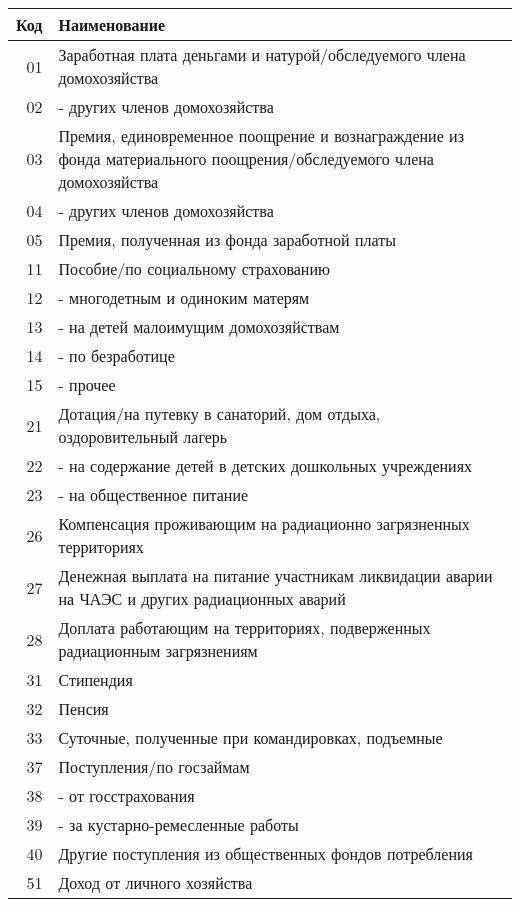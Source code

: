 \documentclass[10pt, a4paper, titlepage]{article}
\begin{document}
\begin{center}
    \begin{longtable}{rp{}}
        \hline
        \textbf{Код} & \textbf{Наименование} \\ \hline
        01 & Заработная плата деньгами и натурой/обследуемого члена домохозяйства \\
        02 & - других членов домохозяйства \\
        03 & Премия, единовременное поощрение и вознаграждение из фонда материального поощрения/обследуемого члена домохозяйства \\
        04 & - других членов домохозяйства \\
        05 & Премия, полученная из фонда заработной платы \\
        11 & Пособие/по социальному страхованию \\
        12 & - многодетным и одиноким матерям \\
        13 & - на детей малоимущим домохозяйствам \\
        14 & - по безработице \\
        15 & - прочее \\
        21 & Дотация/на путевку в санаторий, дом отдыха, оздоровительный лагерь \\
        22 & - на содержание детей в детских дошкольных учреждениях \\
        23 & - на общественное питание \\
        26 & Компенсация проживающим на радиационно загрязненных территориях \\
        27 & Денежная выплата на питание участникам ликвидации аварии на ЧАЭС и других радиационных аварий \\
        28 & Доплата работающим на территориях, подверженных радиационным загрязнениям \\
        31 & Стипендия \\
        32 & Пенсия \\
        33 & Суточные, полученные при командировках, подъемные \\
        37 & Поступления/по госзаймам \\
        38 & - от госстрахования \\
        39 & - за кустарно-ремесленные работы \\
        40 & Другие поступления из общественных фондов потребления \\
        51 & Доход от личного хозяйства \\

\end{longtable}
\end{center}
\end{document}
